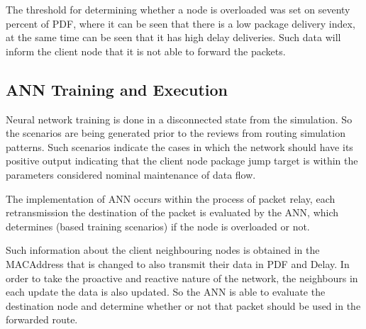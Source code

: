 \documentclass[10pt, conference, compsocconf]{IEEEtran}
\begin{document}

The threshold for determining whether a node is overloaded was set on seventy percent of PDF, where it can be seen that there is a low package delivery index, at the same time can be seen that it has high delay deliveries. Such data will inform the client node that it is not able to forward the packets.

\subsection{ANN Training and Execution}



Neural network training is done in a disconnected state from the simulation. So the scenarios are being generated prior to the reviews from routing simulation patterns. Such scenarios indicate the cases in which the network should have its positive output indicating that the client node package jump target is within the parameters considered nominal maintenance of data flow.


The implementation of ANN occurs within the process of packet relay, each retransmission the destination of the packet is evaluated by the ANN, which determines (based training scenarios) if the node is overloaded or not.

Such information about the client neighbouring nodes is obtained in the MACAddress that is changed to also transmit their data in PDF and Delay. In order to take the proactive and reactive nature of the network, the neighbours in each update the data is also updated. So the ANN is able to evaluate the destination node and determine whether or not that packet should be used in the forwarded route.
\end{document}
